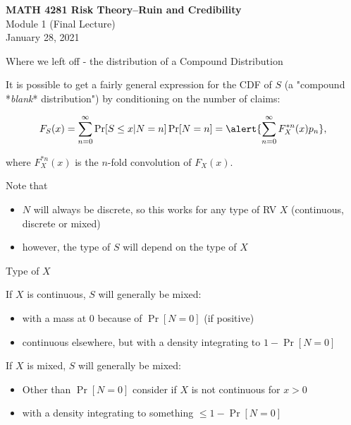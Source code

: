 \documentclass[11pt]{beamer}
\begin{document}
\begin{frame}
  \frametitle{}
  \begin{center}
    \textbf{\large MATH 4281 Risk Theory--Ruin and Credibility}\\
    \vspace{1cm}
    {\large  Module 1 (Final Lecture)} \\
    \vspace{1cm}
    {\large  January 28, 2021}
    \end{center}
    \vspace{1cm}
\end{frame}
\begin{frame}{Where we left off - the distribution of a Compound Distribution}

It is possible to get a fairly general expression for the CDF of $S$ (a "compound *\textit{blank}* distribution") by conditioning on the number of claims:

\vfill

$$F_S(x)=\sum_{n=0}^\infty \Pr[S\le x|N=n]\Pr[N=n]=\alert{\sum_{n=0}^\infty F^{*n}_X(x)p_n},$$

\vfill

where $F^{*n}_X(x)$ is the $n$-fold convolution of $F_X (x)$.

Note that
\begin{itemize}
\item $N$ will always be discrete, so this works for any type of RV $X$ (continuous, discrete or mixed)
\item however, the type of $S$ will depend on the type of $X$
\end{itemize}

\end{frame}
\begin{frame}{Type of $X$}

If $X$ is continuous, $S$ will generally be mixed:
\begin{itemize}
\item with a mass at 0 because of $\Pr[N=0]$ (if positive)
\item continuous elsewhere, but with a density integrating to $1-\Pr[N=0]$
\end{itemize}

\vfill

If $X$ is mixed, $S$ will generally be mixed:
\begin{itemize}
\item Other than $\Pr[N=0]$ consider if $X$ is not continuous for $x>0$
\item with a density integrating to something $\le 1-\Pr[N=0]$
\end{itemize}

\end{frame}
\end{document}
